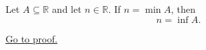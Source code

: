\begin{proposition}
\label{prop:minimum-implies-infimum}
Let $A\subseteq\mathbb{R}$ and let $n\in\mathbb{R}$. If $n=\min A$, then
\[
  n=\inf A.
\]

\hyperref[prf:minimum-implies-infimum]{Go to proof.}
\end{proposition}